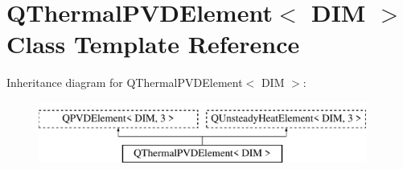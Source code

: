 \hypertarget{classQThermalPVDElement}{}\section{Q\+Thermal\+P\+V\+D\+Element$<$ D\+IM $>$ Class Template Reference}
\label{classQThermalPVDElement}
Inheritance diagram for Q\+Thermal\+P\+V\+D\+Element$<$ D\+IM $>$\+:\begin{figure}[H]
\begin{center}
\leavevmode
\includegraphics[height=2.000000cm]{classQThermalPVDElement}
\end{center}
\end{figure}
